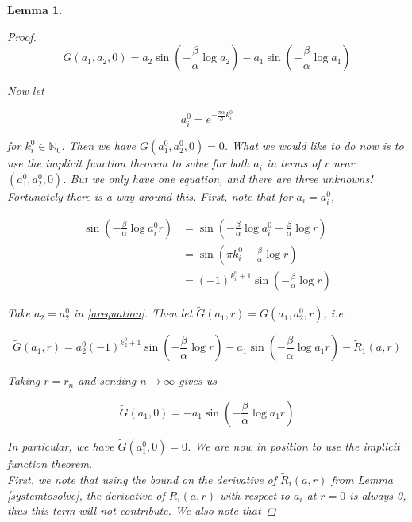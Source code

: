 \documentclass[12pt]{article}
\def\N{{\mathbb N}}
\newtheorem{lemma}{Lemma}
\begin{document}
\begin{lemma}
\begin{proof}
\begin{equation}
G(a_1, a_2, 0) = a_2 \sin \left(-\frac{\beta}{\alpha} \log a_2 \right) - a_1 \sin \left(-\frac{\beta}{\alpha} \log a_1 \right)
\end{equation}

Now let

\begin{equation}
a_i^0 = e^{-\frac{\pi \alpha}{\beta} k_i^0 }
\end{equation}

for $k_i^0 \in \N_0$. Then we have $G(a_1^0, a_2^0, 0) = 0$. What we would like to do now is to use the implicit function theorem to solve for both $a_i$ in terms of $r$ near $(a_1^0, a_2^0, 0)$. But we only have one equation, and there are three unknowns!\\

Fortunately there is a way around this. First, note that for $a_i = a_i^0$,

\begin{align*}
\sin\left( -\frac{\beta}{\alpha} \log a_i^0 r \right)
&= \sin \left( -\frac{\beta}{\alpha} \log a_i^0 - \frac{\beta}{\alpha} \log r \right) \\
&= \sin \left( \pi k_i^0 - \frac{\beta}{\alpha} \log r \right) \\
&= (-1)^{k_i^0 + 1} \sin \left(- \frac{\beta}{\alpha} \log r \right)
\end{align*} 

Take $a_2 = a_2^0$ in \eqref{arequation}.
Then let $\tilde{G}(a_1, r) = G(a_1, a_2^0, r)$, i.e.  

\begin{equation}\label{arequation}
\tilde{G}(a_1, r) = a_2^0 (-1)^{k_2^0 + 1} \sin \left(- \frac{\beta}{\alpha} \log r \right) - a_1 \sin \left( - \frac{\beta}{\alpha} \log a_1 r \right) - \tilde{R}_1(a, r)
\end{equation}

Taking $r = r_n$ and sending $n \rightarrow \infty$ gives us

\begin{equation}\label{arequation}
\tilde{G}(a_1, 0) = - a_1 \sin \left( - \frac{\beta}{\alpha} \log a_1 r \right)
\end{equation}

In particular, we have $\tilde{G}(a_1^0, 0) = 0$. We are now in position to use the implicit function theorem.\\

First, we note that using the bound on the derivative of $\tilde{R}_i(a, r)$ from Lemma \ref{systemtosolve}, the derivative of $\tilde{R}_i(a, r)$ with respect to $a_i$ at $r = 0$ is always 0, thus this term will not contribute. We also note that


\end{proof}
\end{lemma}
\end{document}
